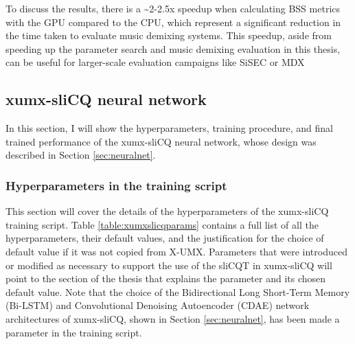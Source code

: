 \documentclass[report.tex]{subfiles}
\begin{document}
To discuss the results, there is a \textasciitilde2-2.5x speedup when calculating BSS metrics with the GPU compared to the CPU, which represent a significant reduction in the time taken to evaluate music demixing systems. This speedup, aside from speeding up the parameter search and music demixing evaluation in this thesis, can be useful for larger-scale evaluation campaigns like SiSEC \parencite{sisec2018} or MDX \parencite{mdx21}

\newpagefill

\subsection{xumx-sliCQ neural network}
\label{sec:nnresults}

In this section, I will show the hyperparameters, training procedure, and final trained performance of the xumx-sliCQ neural network, whose design was described in Section \ref{sec:neuralnet}.

\subsubsection{Hyperparameters in the training script}
\label{sec:hyperparams}

This section will cover the details of the hyperparameters of the xumx-sliCQ training script. Table \ref{table:xumxslicqparams} contains a full list of all the hyperparameters, their default values, and the justification for the choice of default value if it was not copied from X-UMX. Parameters that were introduced or modified as necessary to support the use of the sliCQT in xumx-sliCQ will point to the section of the thesis that explains the parameter and its chosen default value. Note that the choice of the Bidirectional Long Short-Term Memory (Bi-LSTM) and Convolutional Denoising Autoencoder (CDAE) network architectures of xumx-sliCQ, shown in Section \ref{sec:neuralnet}, has been made a parameter in the training script.
\end{document}
